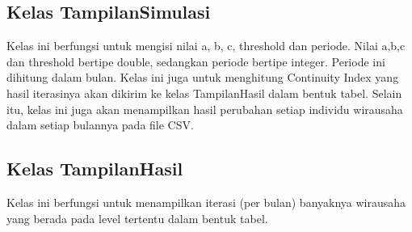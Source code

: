 \subsection{Kelas TampilanSimulasi}
Kelas ini berfungsi untuk mengisi nilai a, b, c, threshold dan periode. Nilai a,b,c dan threshold bertipe double, sedangkan periode bertipe integer. Periode ini dihitung dalam bulan. Kelas ini juga untuk menghitung Continuity Index yang hasil iterasinya akan dikirim ke kelas TampilanHasil dalam bentuk tabel. Selain itu, kelas ini juga akan menampilkan hasil perubahan setiap individu wirausaha dalam setiap bulannya pada file CSV.

\subsection{Kelas TampilanHasil}
Kelas ini berfungsi untuk menampilkan iterasi (per bulan) banyaknya wirausaha yang berada pada level tertentu dalam bentuk tabel.

